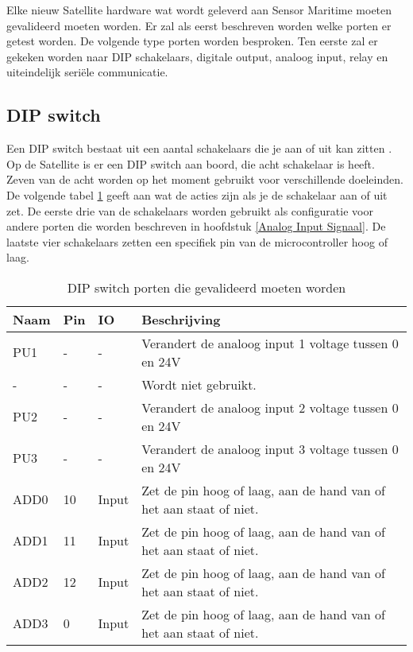 Elke nieuw Satellite hardware wat wordt geleverd aan Sensor Maritime moeten gevalideerd moeten worden. Er zal als eerst beschreven worden welke porten er getest worden. De volgende type porten worden besproken. Ten eerste zal er gekeken worden naar DIP schakelaars, digitale output, analoog input, relay en uiteindelijk seriële communicatie.

\subsection{DIP switch}
Een DIP switch bestaat uit een aantal schakelaars die je aan of uit kan zitten \autocite{DIP}. Op de Satellite is er een DIP switch aan boord, die acht schakelaar is heeft. Zeven van de acht worden op het moment gebruikt voor verschillende doeleinden. De volgende tabel \ref{tab:hw_val_dip} geeft aan wat de acties zijn als je de schakelaar aan of uit zet. De eerste drie van de schakelaars worden gebruikt als configuratie voor andere porten die worden beschreven in hoofdstuk \ref{Analog Input Signaal}. De laatste vier schakelaars zetten een specifiek pin van de microcontroller hoog of laag.
\begin{table}[h!]
	\caption{DIP switch porten die gevalideerd moeten worden}
	\begin{tabular}{lllp{12cm}}
	\toprule
	\textbf{Naam} & \textbf{Pin} & \textbf{IO} & \textbf{Beschrijving}	\\ \toprule
	PU1		& - 	& -    		& Verandert de analoog input 1 voltage tussen 0 en 24V	\\
	-		& - 	& -    		& Wordt niet gebruikt.								\\
	PU2		& - 	& -    		& Verandert de analoog input 2 voltage tussen 0 en 24V	\\
	PU3		& - 	& -    		& Verandert de analoog input 3 voltage tussen 0 en 24V	\\
	ADD0 	& 10	& Input		& Zet de pin hoog of laag, aan de hand van of het aan staat of niet.		\\
	ADD1 	& 11	& Input		& Zet de pin hoog of laag, aan de hand van of het aan staat of niet.		\\
	ADD2 	& 12	& Input		& Zet de pin hoog of laag, aan de hand van of het aan staat of niet.		\\
	ADD3 	& 0 	& Input		& Zet de pin hoog of laag, aan de hand van of het aan staat of niet.		\\ \bottomrule
	\end{tabular}
	\label{tab:hw_val_dip}
\end{table}


